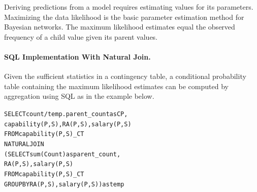 Deriving predictions from a model requires estimating values for its parameters.  Maximizing the data likelihood is the basic parameter estimation method for Bayesian networks. The maximum likelihood estimates equal the observed frequency of a child value given its parent values.

\paragraph{SQL Implementation With Natural Join.} Given the sufficient statistics in a contingency table, a conditional probability table containing the maximum likelihood estimates can be computed by aggregation using SQL as in the example below. 

\begin{alltt}
SELECT count/temp.parent\_count as CP, 
capability(P,S), RA(P,S), salary(P,S) 
FROM capability(P,S)\_CT 
NATURAL JOIN  
(SELECT sum(Count) as parent\_count, 
RA(P,S), salary(P,S) 
FROM capability(P,S)\_CT  
GROUP BY  RA(P,S), salary(P,S) ) as temp
\end{alltt}


%
%



